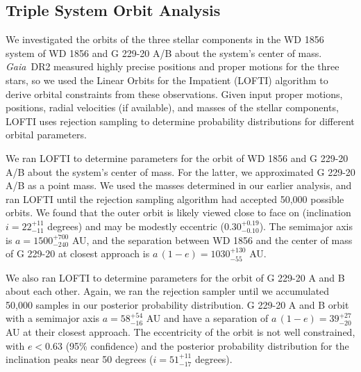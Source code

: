 \documentclass{nature3}
\newcommand{\project}[1]{\textsl{#1}}
\newcommand{\Gaia}{\project{Gaia}}
\begin{document}
\begin{methods}
\subsection{Triple System Orbit Analysis}
We investigated the orbits of the three stellar components in the WD 1856 system of WD 1856 and G 229-20 A/B about the system's center of mass. \Gaia\ DR2 measured highly precise positions and proper motions for the three stars, so we used the Linear Orbits for the Impatient (LOFTI\cite{lofticode}) algorithm\cite{pearce20} to derive orbital constraints from these observations. Given input proper motions, positions, radial velocities (if available), and masses of the stellar components, LOFTI uses rejection sampling\cite{blunt} to determine probability distributions for different orbital parameters. 

We ran LOFTI to determine parameters for the orbit of WD 1856 and G 229-20 A/B about the system's center of mass. For the latter, we approximated G 229-20 A/B as a point mass. We used the masses determined in our earlier analysis, and ran LOFTI until the rejection sampling algorithm had accepted 50,000 possible orbits. We found that the outer orbit is likely viewed close to face on (inclination $i = 22^{+11}_{-11}$ degrees) and may be modestly eccentric ($0.30\ensuremath{^{+0.19}_{-0.10}}$). The semimajor axis is $a=1500\ensuremath{^{+700}_{-240}}$ AU, and the separation between WD 1856 and the center of mass of G 229-20 at closest approach is $a\,(1-e)= 1030\ensuremath{^{+130}_{-55}}$ AU. 

We also ran LOFTI to determine parameters for the orbit of G 229-20 A and B about each other. Again, we ran the rejection sampler until we accumulated 50,000 samples in our posterior probability distribution.  G 229-20 A and B orbit with a semimajor axis $a = 58\ensuremath{^{+54}_{-16}}$ AU and have a separation of $a\,(1-e)= 39\ensuremath{^{+27}_{-20}}$ AU at their closest approach.  The eccentricity of the orbit is not well constrained, with $e<0.63$ (95\% confidence) and the posterior probability distribution for the inclination peaks near 50 degrees ($i = 51\ensuremath{^{+11}_{-17}}$ degrees). 




\end{methods}
\end{document}
